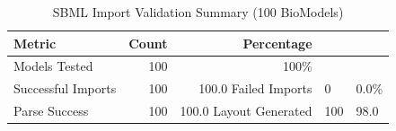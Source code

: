 \begin{table}[htbp]
\centering
\caption{SBML Import Validation Summary (100 BioModels)}
\label{tab:sbml-import-summary}
\begin{tabular}{lrr}
\toprule
\textbf{Metric} & \textbf{Count} & \textbf{Percentage} \\
\midrule
Models Tested & 100 & 100\% \\
Successful Imports & 100 & 100.0%
Failed Imports & 0 & 0.0\% \\
\midrule
Parse Success & 100 & 100.0%
Layout Generated & 100 & 98.0%
\bottomrule
\end{tabular}
\end{table}

